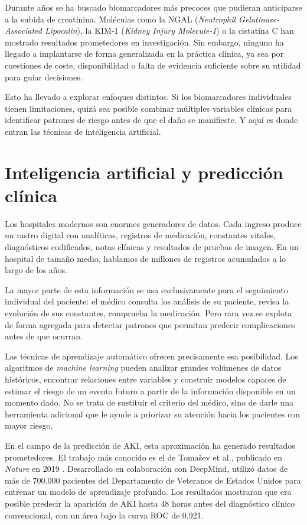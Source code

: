 \documentclass[12pt, a4paper, oneside]{report}
\begin{document}
Durante años se ha buscado biomarcadores más precoces que pudieran anticiparse a la subida de creatinina. Moléculas como la NGAL (\textit{Neutrophil Gelatinase-Associated Lipocalin}), la KIM-1 (\textit{Kidney Injury Molecule-1}) o la cistatina C han mostrado resultados prometedores en investigación. Sin embargo, ninguno ha llegado a implantarse de forma generalizada en la práctica clínica, ya sea por cuestiones de coste, disponibilidad o falta de evidencia suficiente sobre su utilidad para guiar decisiones.

Esto ha llevado a explorar enfoques distintos. Si los biomarcadores individuales tienen limitaciones, quizá sea posible combinar múltiples variables clínicas para identificar patrones de riesgo antes de que el daño se manifieste. Y aquí es donde entran las técnicas de inteligencia artificial.

\section{Inteligencia artificial y predicción clínica}

Los hospitales modernos son enormes generadores de datos. Cada ingreso produce un rastro digital con analíticas, registros de medicación, constantes vitales, diagnósticos codificados, notas clínicas y resultados de pruebas de imagen. En un hospital de tamaño medio, hablamos de millones de registros acumulados a lo largo de los años.

La mayor parte de esta información se usa exclusivamente para el seguimiento individual del paciente: el médico consulta los análisis de su paciente, revisa la evolución de sus constantes, comprueba la medicación. Pero rara vez se explota de forma agregada para detectar patrones que permitan predecir complicaciones antes de que ocurran.

Las técnicas de aprendizaje automático ofrecen precisamente esa posibilidad. Los algoritmos de \textit{machine learning} pueden analizar grandes volúmenes de datos históricos, encontrar relaciones entre variables y construir modelos capaces de estimar el riesgo de un evento futuro a partir de la información disponible en un momento dado. No se trata de sustituir el criterio del médico, sino de darle una herramienta adicional que le ayude a priorizar su atención hacia los pacientes con mayor riesgo.

En el campo de la predicción de AKI, esta aproximación ha generado resultados prometedores. El trabajo más conocido es el de Tomašev et al., publicado en \textit{Nature} en 2019 \parencite{tomasev2019nature}. Desarrollado en colaboración con DeepMind, utilizó datos de más de 700.000 pacientes del Departamento de Veteranos de Estados Unidos para entrenar un modelo de aprendizaje profundo. Los resultados mostraron que era posible predecir la aparición de AKI hasta 48 horas antes del diagnóstico clínico convencional, con un área bajo la curva ROC de 0,921.
\end{document}

